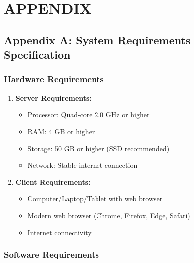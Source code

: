 \chapter{APPENDIX}
\label{appendix}

\section{Appendix A: System Requirements Specification}

\subsection{Hardware Requirements}

\begin{enumerate}
    \item \textbf{Server Requirements:}
    \begin{itemize}
        \item Processor: Quad-core 2.0 GHz or higher
        \item RAM: 4 GB or higher
        \item Storage: 50 GB or higher (SSD recommended)
        \item Network: Stable internet connection
    \end{itemize}

    \item \textbf{Client Requirements:}
    \begin{itemize}
        \item Computer/Laptop/Tablet with web browser
        \item Modern web browser (Chrome, Firefox, Edge, Safari)
        \item Internet connectivity
    \end{itemize}
\end{enumerate}

\subsection{Software Requirements}

